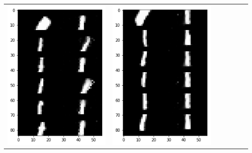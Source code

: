 \documentclass[12pt]{report} %
\begin{document}
\begin{tabular}{m{0.7cm}m{2.4cm}m{2.4cm}m{2.4cm}m{2.4cm}m{2.4cm}m{2.4cm}}
\includegraphics[scale=0.3]{pictures/M1_1_up.png} & \includegraphics[scale=0.3]{pictures/M1_1_down.png} &

\end{tabular}
\end{document}
